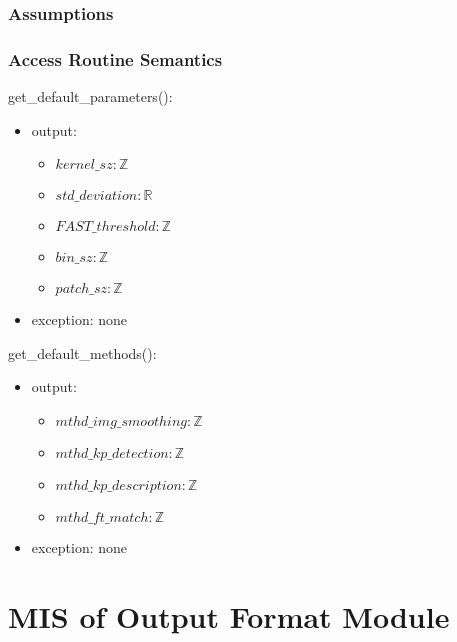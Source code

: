 \documentclass[12pt, titlepage]{article}
\begin{document}
\subsubsection{Assumptions}


\subsubsection{Access Routine Semantics}
\noindent get\_default\_parameters():
\begin{itemize}
\item output:
  \begin{itemize}
  \item $kernel\_sz: \mathbb{Z}$
  \item $std\_deviation: \mathbb{R}$ 
  \item $FAST\_threshold: \mathbb{Z}$ 
  \item $bin\_sz: \mathbb{Z}$ 
  \item $patch\_sz: \mathbb{Z}$ 
  \end{itemize}
  \item exception: none  
\end{itemize}

\noindent get\_default\_methods():
\begin{itemize}
\item output:
  \begin{itemize}
    \item $mthd\_img\_smoothing: \mathbb{Z}$
    \item $mthd\_kp\_detection: \mathbb{Z}$ 
    \item $mthd\_kp\_description: \mathbb{Z}$
    \item $mthd\_ft\_match: \mathbb{Z}$
  \end{itemize}
  \item exception: none 
\end{itemize}



\section{MIS of Output Format Module} \label{mOF}

\end{document}
